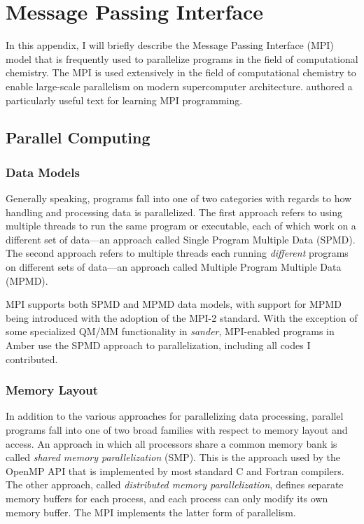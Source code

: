 \chapter{Message Passing Interface}
\label{appendixC}

In this appendix, I will briefly describe the Message Passing Interface (MPI)
model that is frequently used to parallelize programs in the field of
computational chemistry. The MPI is used extensively in the field of
computational chemistry to enable large-scale parallelism on modern
supercomputer architecture. \citeauthor{Pachecho1997} authored a particularly
useful text for learning MPI programming. \cite{Pachecho1997}

\section{Parallel Computing}

\subsection{Data Models}

Generally speaking, programs fall into one of two categories with regards to how
handling and processing data is parallelized. The first approach refers to using
multiple threads to run the same program or executable, each of which work on a
different set of data---an approach called Single Program Multiple Data (SPMD).
The second approach refers to multiple threads each running \emph{different}
programs on different sets of data---an approach called Multiple Program
Multiple Data (MPMD).

MPI supports both SPMD and MPMD data models, with support for MPMD being
introduced with the adoption of the MPI-2 standard. With the exception of some
specialized QM/MM functionality in \emph{sander}, MPI-enabled programs in Amber
use the SPMD approach to parallelization, including all codes I contributed.

\subsection{Memory Layout}

In addition to the various approaches for parallelizing data processing,
parallel programs fall into one of two broad families with respect to memory
layout and access. An approach in which all processors share a common memory
bank is called \emph{shared memory parallelization} (SMP). This is the approach
used by the OpenMP API that is implemented by most standard C and Fortran
compilers. The other approach, called \emph{distributed memory parallelization},
defines separate memory buffers for each process, and each process can only
modify its own memory buffer. The MPI implements the latter form of parallelism.

